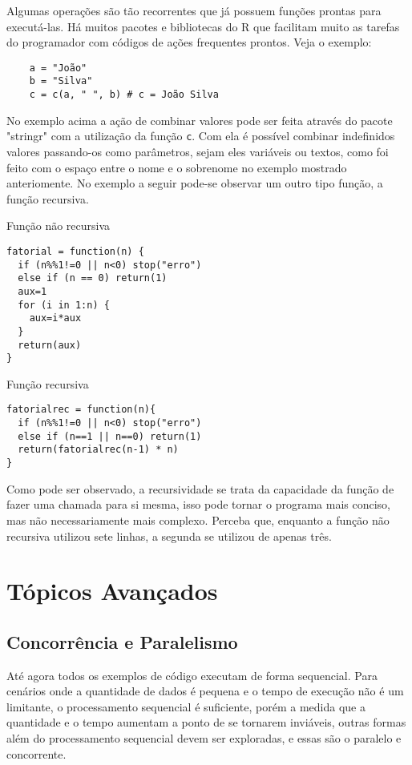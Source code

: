 \documentclass[12pt]{article}
\begin{document}
Algumas operações são tão recorrentes que já possuem funções prontas para executá-las. Há muitos pacotes e bibliotecas do R que facilitam muito as tarefas do programador com códigos de ações frequentes prontos. Veja o exemplo:

\begin{verbatim}
    a = "João"
    b = "Silva"
    c = c(a, " ", b) # c = João Silva
\end{verbatim}

No exemplo acima a ação de combinar valores pode ser feita através do pacote "stringr" com a utilização da função \texttt{c}. Com ela é possível combinar indefinidos valores passando-os como parâmetros, sejam eles variáveis ou textos, como foi feito com o espaço entre o nome e o sobrenome no exemplo mostrado anteriomente. No exemplo a seguir pode-se observar um outro tipo função, a função recursiva.

Função não recursiva

\begin{verbatim}
fatorial = function(n) {
  if (n%%1!=0 || n<0) stop("erro")   
  else if (n == 0) return(1)
  aux=1
  for (i in 1:n) {
    aux=i*aux
  }
  return(aux)
}
\end{verbatim}

Função  recursiva

\begin{verbatim}
fatorialrec = function(n){
  if (n%%1!=0 || n<0) stop("erro")
  else if (n==1 || n==0) return(1)
  return(fatorialrec(n-1) * n)
}
\end{verbatim}

Como pode ser observado, a recursividade se trata da capacidade da função de fazer uma chamada para si mesma, isso pode tornar o programa mais conciso, mas não necessariamente mais complexo. Perceba que, enquanto a função não recursiva utilizou sete linhas, a segunda se utilizou de apenas três. 

\section{Tópicos Avançados} \label{sec:Tópicos Avançados}
\subsection{Concorrência e Paralelismo}

Até agora todos os exemplos de código executam de forma sequencial. Para cenários onde a quantidade de dados é pequena e o tempo de execução não é um limitante, o processamento sequencial é suficiente, porém a medida que a quantidade e o tempo aumentam a ponto de se tornarem inviáveis, outras formas além do processamento sequencial devem ser exploradas, e essas são o paralelo e concorrente.
\end{document}
